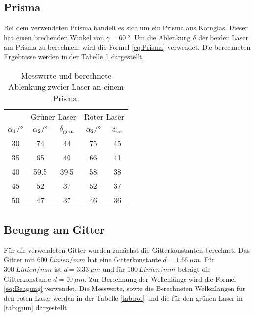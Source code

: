 \subsection{Prisma}

Bei dem verwendeten Prisma handelt es sich um ein Prisma aus Kornglas.
Dieser hat einen brechenden Winkel von $\gamma = \qty{60}{°}$.
Um die Ablenkung $\delta$ der beiden Laser am Prisma zu berechnen, wird die Formel \ref{eq:Prisma} verwendet.
Die berechneten Ergebnisse werden in der Tabelle \ref{tab:Prisma} dargestellt.

\begin{table}[H]
  \centering
  \caption{Messwerte und berechnete Ablenkung zweier Laser an einem Prisma.}
  \label{tab:Prisma}
  \begin{tabular}{c c c c c}
    \toprule
  & \multicolumn{2}{c}{Grüner Laser} & \multicolumn{2}{c}{Roter Laser} \\
\cmidrule(lr){2-3}\cmidrule(lr){4-5}
    $\alpha_1 / °$ & $\alpha_2  /° $ & $\delta_\text{grün}$ &  $\alpha_2  /°$ & $\delta_\text{rot}$ \\
    \midrule
    30 & 74    & 44   & 75 & 45 \\  
    35 & 65    & 40   & 66 & 41 \\    
    40 & 59.5  & 39.5 & 58 & 38 \\  
    45 & 52    & 37   & 52 & 37 \\  
    50 & 47    & 37   & 46 & 36 \\   
    \bottomrule
  \end{tabular}
\end{table}


\subsection{Beugung am Gitter}

Für die verwendeten Gitter wurden zunächst die Gitterkonstanten berechnet.
Das Gitter mit $\qty{600}{Linien/mm}$ hat eine Gitterkonstante $d = \qty{1.66}{\mu m}$.
Für $\qty{300}{Linien/mm}$ ist $d = \qty{3.33}{\mu m}$ und für $\qty{100}{Linien/mm}$ beträgt die Gitterkonstante $d = \qty{10}{\mu m}$.
Zur Berechnung der Wellenlänge wird die Formel \ref{eq:Beugung} verwendet.
Die Messwerte, sowie die Berechneten Wellenlängen für den roten Laser werden in der Tabelle \ref{tab:rot} und die für den grünen Laser in \ref{tab:grün} dargestellt.

